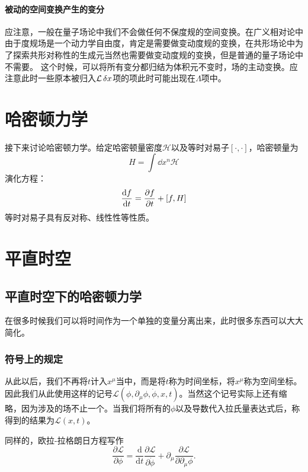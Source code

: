 \documentclass[UTF8, a4paper]{ctexart}
\begin{document}
\paragraph{被动的空间变换产生的变分}

应注意，一般在量子场论中我们不会做任何不保度规的空间变换。在广义相对论中由于度规场是一个动力学自由度，肯定是需要做变动度规的变换，在共形场论中为了探索共形对称性的生成元当然也需要做变动度规的变换，但是普通的量子场论中不需要。
这个时候，可以将所有变分都归结为体积元不变时，场的主动变换。应注意此时一些原本被归入$\mathcal{L} \var{x}$项的项此时可能出现在$\Lambda$项中。

\section{哈密顿力学}\label{sec:hamiltionian-dynamics}

接下来讨论哈密顿力学。给定哈密顿量密度$\mathcal{H}$以及等时对易子$[\cdot, \cdot]$，哈密顿量为
\begin{equation}
    H = \int \dd x^n \mathcal{H}
\end{equation}
演化方程：
\begin{equation}
    \dv{f}{t} = \pdv{f}{t} + [f, H]
\end{equation}
等时对易子具有反对称、线性性等性质。

\section{平直时空}

\subsection{平直时空下的哈密顿力学}
在很多时候我们可以将时间作为一个单独的变量分离出来，此时很多东西可以大大简化。

\subsubsection{符号上的规定}
从此以后，我们不再将$t$计入$x^\mu$当中，而是将$t$称为时间坐标，将$x^\mu$称为空间坐标。因此我们从此使用这样的记号$\mathcal{L}(\phi, \partial_\mu \phi, \dot{\phi}, x, t)$。当然这个记号实际上还有缩略，因为涉及的场不止一个。当我们将所有的$\phi$以及导数代入拉氏量表达式后，称得到的结果为$\mathcal{L}(x, t)$。

同样的，欧拉-拉格朗日方程写作
\begin{equation}
    \frac{\partial \mathcal{L}}{\partial \phi} = \frac{\mathrm{d}}{\mathrm{d}t} \frac{\partial \mathcal{L}}{\partial \dot{\phi}} + \partial_\mu \frac{\partial \mathcal{L}}{\partial \partial_\mu \phi}. 
\end{equation}
\end{document}
